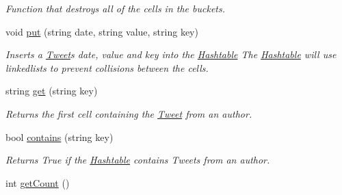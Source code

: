 \begin{DoxyCompactItemize}
\begin{DoxyCompactList}\small\item\em Function that destroys all of the cells in the buckets. \end{DoxyCompactList}\item 
void \hyperlink{class_hashtable_a32863d770f67d2781e3faac30979283f}{put} (string date, string value, string key)
\begin{DoxyCompactList}\small\item\em Inserts a \hyperlink{class_tweet}{Tweet}\textquotesingle{}s date, value and key into the \hyperlink{class_hashtable}{Hashtable} The \hyperlink{class_hashtable}{Hashtable} will use linkedlists to prevent collisions between the cells. \end{DoxyCompactList}\item 
string \hyperlink{class_hashtable_aa37000a2fddcbf2412fe769224b14931}{get} (string key)
\begin{DoxyCompactList}\small\item\em Returns the first cell containing the \hyperlink{class_tweet}{Tweet} from an author. \end{DoxyCompactList}\item 
bool \hyperlink{class_hashtable_a8ecfa9db9daad0404d543f517a926ca4}{contains} (string key)
\begin{DoxyCompactList}\small\item\em Returns True if the \hyperlink{class_hashtable}{Hashtable} contains Tweets from an author. \end{DoxyCompactList}\item 
\hypertarget{class_hashtable_aeacb035a1a111f4a852decc24e42b76b}{}int \hyperlink{class_hashtable_aeacb035a1a111f4a852decc24e42b76b}{get\+Count} ()\label{class_hashtable_aeacb035a1a111f4a852decc24e42b76b}


\end{DoxyCompactItemize}
